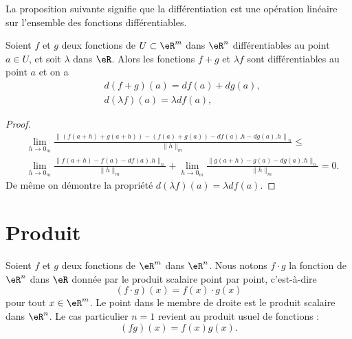 La proposition suivante signifie que la différentiation est une opération linéaire sur l'ensemble des fonctions différentiables.
\begin{proposition}		\label{PropDiffLineaire}
	Soient \( f\) et \( g\) deux fonctions de \( U\subset\eR^m\) dans \( \eR^n\) différentiables au point \( a\in U\), et soit \( \lambda\) dans \( \eR\). Alors les fonctions \( f+g\) et \( \lambda f\) sont différentiables au point \( a\) et on a
	\begin{equation}
		\begin{aligned}
			 & d(f+g)(a)=df(a)+dg(a),         \\
			 & d(\lambda f)(a)=\lambda df(a),
		\end{aligned}
	\end{equation}
\end{proposition}
\begin{proof}
	\begin{equation}
		\begin{aligned}
			 & \lim_{h\to 0_m}\frac{\left\|\left(f(a+h)+g(a+h)\right)-\left(f(a)+g(a)\right)-df(a).h-dg(a).h\right\|_n}{\|h\|_m}\leq \\
			 & \lim_{h\to 0_m}\frac{\|f(a+h)-f(a)-df(a).h\|_n}{\|h\|_m}+\lim_{h\to 0_m}\frac{\|g(a+h)-g(a)-dg(a).h\|_n}{\|h\|_m}=0.
		\end{aligned}
	\end{equation}
	De même on démontre la  propriété \( d(\lambda f)(a)=\lambda df(a)\).
\end{proof}

\section{Produit}

Soient \( f\) et \( g\) deux fonctions de \( \eR^m\) dans \( \eR^n\). Nous notons \( f\cdot g\) la fonction de \( \eR^n\) dans \( \eR\) donnée par le produit scalaire point par point, c'est-à-dire
\begin{equation}
	(f\cdot g)(x)=f(x)\cdot g(x)
\end{equation}
pour tout \( x\in\eR^m\). Le point dans le membre de droite est le produit scalaire dans \( \eR^n\). Le cas particulier \( n=1\) revient au produit usuel de fonctions :
\begin{equation}
	(fg)(x)=f(x)g(x).
\end{equation}

